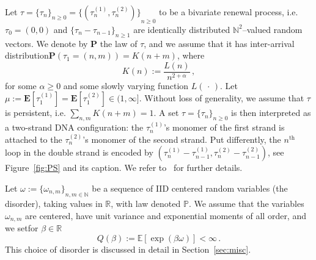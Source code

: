 \documentclass[10pt]{amsart}
\theoremstyle{definition}\newtheorem{defi}[theo]{Definition}\newtheorem{rema}[theo]{Remark}\newtheorem{exam}[theo]{Example}\newtheorem{exem}[theo]{Example}\newtheorem{nota}[theo]{Notation}
\DeclareMathOperator{\tHt}{th}
\newcommand{\ga}{\alpha}
\newcommand{\bP}{\ensuremath{\mathbf{P}}}
\newcommand{\bE}{\ensuremath{\mathbf{E}}}
\newcommand{\bbE}{\ensuremath{\mathbb{E}}}
\newcommand{\bbN}{\ensuremath{\mathbb{N}}}
\newcommand{\bbP}{\ensuremath{\mathbb{P}}}
\newcommand{\bbR}{\ensuremath{\mathbb{R}}}
\begin{document}
Let $\tau = {\lbrace \tau_n \rbrace}_{n\geq 0}= {\lbrace (\tau_n^{(1)}, \tau_n^{(2)}) \rbrace}_{n\geq 0}$ to be a bivariate renewal process, i.e. $\tau_0 = (0,0)$ and $\{ \tau_{n} - \tau_{n-1}\}_{n \geq 1}$ are identically distributed $\mathbb{N}^2$--valued random vectors. We denote by $\bP$ the law of $\tau$, and we assume that it has inter-arrival distribution\linebreak $\bP(\tau_1= (n,m))= K(n+m)$, where
\begin{equation}\label{def:Kn}
K(n) := \frac{L(n)}{n^{2+\ga}}\,,
\end{equation}
for some $\ga \ge 0$ and some slowly varying function $L({\,\cdot\,})$. Let $\mu := \bE [\tau_1^{(1)}]= \bE [\tau_1^{(2)}]\in (1, \infty]$. Without loss of generality, we assume that $\tau$ is persistent, i.e. $\sum_{n,m} K(n+m) =1$. A set $\tau={\lbrace \tau_n \rbrace}_{n\geq 0}$ is then interpreted as a two-strand DNA configuration: the $\tau_n^{(1)}$'s monomer of the first strand is attached to the $\tau_n^{(2)}$'s monomer of the second strand. Put differently, the $n^{\tHt}$ loop in the double strand is encoded by $(\tau_n^{(1)}-\tau_{n-1}^{(1)},\tau_n^{(2)}-\tau_{n-1}^{(2)})$, see Figure~\ref{fig:PS} and its caption. We refer to~\cite{cf:GK} for further details.

Let $ \omega := { \lbrace \omega_{n,m} \rbrace }_{n,m \in \bbN}$ be a sequence of IID centered random variables (the disorder), taking values in $\bbR$, with law denoted $\bbP$. We assume that the variables $\omega_{n,m}$ are centered, have unit variance and exponential moments of all order, and we set\linebreak for $\beta \in \bbR$
\begin{equation}\label{eq:defQ}
Q(\beta) := \bbE [\exp(\beta \omega)] < \infty\,.
\end{equation}
This choice of disorder is discussed in detail in Section~\ref{sec:misc}.
\end{document}
